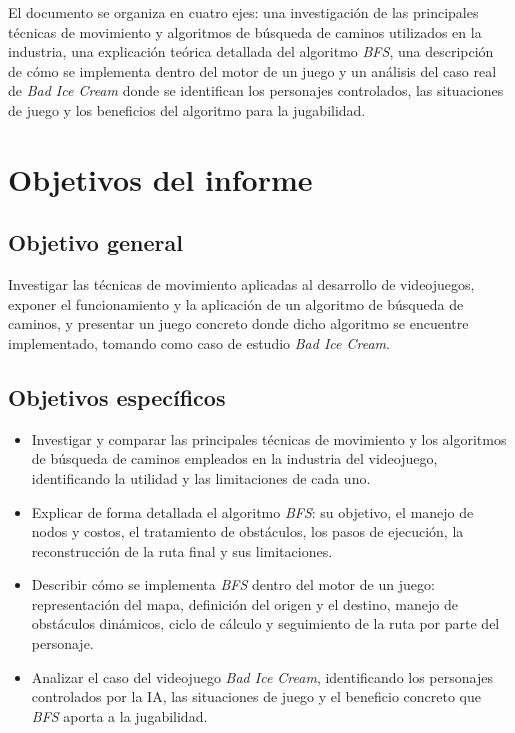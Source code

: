 \documentclass[12pt,letterpaper]{article}
\begin{document}
El documento se organiza en cuatro ejes: una investigación de las principales técnicas de movimiento y algoritmos de búsqueda de caminos utilizados en la industria, una explicación teórica detallada del algoritmo \textit{BFS}, una descripción de cómo se implementa dentro del motor de un juego y un análisis del caso real de \textit{Bad Ice Cream} donde se identifican los personajes controlados, las situaciones de juego y los beneficios del algoritmo para la jugabilidad.

\section{Objetivos del informe}

\subsection{Objetivo general}

Investigar las técnicas de movimiento aplicadas al desarrollo de videojuegos, exponer el funcionamiento y la aplicación de un algoritmo de búsqueda de caminos, y presentar un juego concreto donde dicho algoritmo se encuentre implementado, tomando como caso de estudio \textit{Bad Ice Cream}.

\subsection{Objetivos específicos}

\begin{itemize}
  \item Investigar y comparar las principales técnicas de movimiento y los algoritmos de búsqueda de caminos empleados en la industria del videojuego, identificando la utilidad y las limitaciones de cada uno.
  \item Explicar de forma detallada el algoritmo \textit{BFS}: su objetivo, el manejo de nodos y costos, el tratamiento de obstáculos, los pasos de ejecución, la reconstrucción de la ruta final y sus limitaciones.
  \item Describir cómo se implementa \textit{BFS} dentro del motor de un juego: representación del mapa, definición del origen y el destino, manejo de obstáculos dinámicos, ciclo de cálculo y seguimiento de la ruta por parte del personaje.
  \item Analizar el caso del videojuego \textit{Bad Ice Cream}, identificando los personajes controlados por la IA, las situaciones de juego y el beneficio concreto que \textit{BFS} aporta a la jugabilidad.
\end{itemize}
\end{document}

